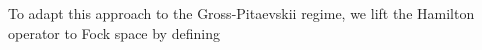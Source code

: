 \documentclass[11pt,a4paper]{article}
\newcommand{\cU}{{\cal U}}
\newcommand{\cH}{{\cal H}}
\newcommand{\cL}{{\cal L}}
\begin{document}
%
To adapt this approach to the Gross-Pitaevskii regime, we lift the Hamilton operator to Fock space by defining
\end{document}
